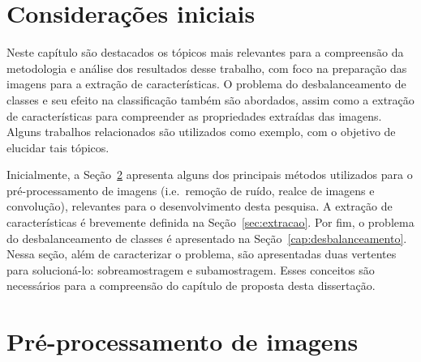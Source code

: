 \section{Considerações iniciais}

Neste capítulo são destacados os tópicos mais relevantes para a compreensão da metodologia e análise dos resultados desse trabalho, com foco na preparação das imagens para a extração de características. O problema do desbalanceamento de classes e seu efeito na classificação também são abordados, assim como a extração de características para compreender as propriedades extraídas das imagens. Alguns trabalhos relacionados são utilizados como exemplo, com o objetivo de elucidar tais tópicos.

Inicialmente, a Seção~\ref{sec:preprocessamento} apresenta alguns dos principais métodos utilizados para o pré-processamento de imagens (i.e.\ remoção de ruído, realce de imagens e convolução), relevantes para o desenvolvimento desta pesquisa.
A extração de características é brevemente definida na Seção~\ref{sec:extracao}. Por fim, o problema do desbalanceamento de classes é apresentado na Seção~\ref{cap:desbalanceamento}. Nessa seção, além de caracterizar o problema, são apresentadas duas vertentes para solucioná-lo: sobreamostragem e subamostragem. Esses conceitos são necessários para a compreensão do capítulo de proposta desta dissertação.


\section{Pré-processamento de imagens}
\label{sec:preprocessamento}

